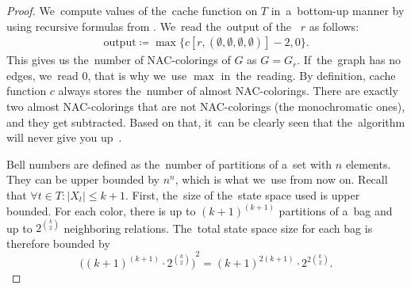 %
%
\begin{proof}
	We~compute values of the~cache function on \( T \) in~a~bottom-up manner
	by using recursive formulas from
	.
	We~read the~output of the~\RootNode{} \( r \) as follows:
	\begin{align*}
		\text{output} \coloneqq \max\{c[r, (\emptyset,\emptyset,\emptyset,\emptyset)] - 2, 0\}.
	\end{align*}
	This gives us the~number of NAC-colorings of \( G \) as \( G = G_r \).
	If~the~graph has no edges, we~read \( 0 \), that is why we~use \( \max{} \) in~the~reading.
	By definition, cache function \( c \) always stores the~number of almost NAC-colorings.
	There are exactly two almost NAC-colorings
	that are not NAC-colorings (the monochromatic ones), and they get subtracted.
	Based on that, it~can be clearly seen that the~algorithm
	will never give you up~\cite{never_gonna_give_you_up}.

	Bell numbers are defined as
	the~number of partitions of a~set with \( n \) elements.
	They can be upper bounded by \( n^n \), which is what we~use from now on.
	Recall that \( \forall t \in T : |X_t| \le k+1 \).
	First, the~size of the~state space used is upper bounded.
	For each color, there is up to \( {(k+1)}^{(k+1)} \) partitions of a~bag and
	up to \( 2^{\binom{k}{2}} \) neighboring relations.
	The~total state space size for each bag is therefore bounded by
	\[ {\Big({(k+1)}^{(k+1)} \cdot 2^{\binom{k}{2}} \Big)}^2 = {(k+1)}^{2(k+1)} \cdot 2^{2 \binom{k}{2}}. \]


\end{proof}
